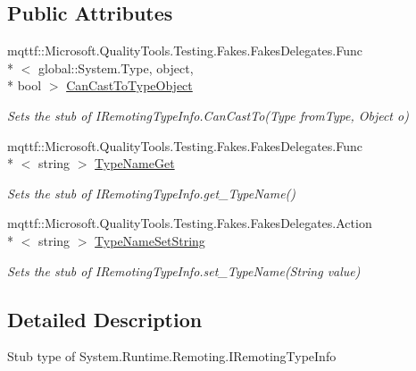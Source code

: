 \subsection*{Public Attributes}
\begin{DoxyCompactItemize}
\item 
mqttf\-::\-Microsoft.\-Quality\-Tools.\-Testing.\-Fakes.\-Fakes\-Delegates.\-Func\\*
$<$ global\-::\-System.\-Type, object, \\*
bool $>$ \hyperlink{class_system_1_1_runtime_1_1_remoting_1_1_fakes_1_1_stub_i_remoting_type_info_abefce566b24758bd25e3bb2ed4827655}{Can\-Cast\-To\-Type\-Object}
\begin{DoxyCompactList}\small\item\em Sets the stub of I\-Remoting\-Type\-Info.\-Can\-Cast\-To(\-Type from\-Type, Object o)\end{DoxyCompactList}\item 
mqttf\-::\-Microsoft.\-Quality\-Tools.\-Testing.\-Fakes.\-Fakes\-Delegates.\-Func\\*
$<$ string $>$ \hyperlink{class_system_1_1_runtime_1_1_remoting_1_1_fakes_1_1_stub_i_remoting_type_info_ac6a30122dd3130e626103a717c73b821}{Type\-Name\-Get}
\begin{DoxyCompactList}\small\item\em Sets the stub of I\-Remoting\-Type\-Info.\-get\-\_\-\-Type\-Name()\end{DoxyCompactList}\item 
mqttf\-::\-Microsoft.\-Quality\-Tools.\-Testing.\-Fakes.\-Fakes\-Delegates.\-Action\\*
$<$ string $>$ \hyperlink{class_system_1_1_runtime_1_1_remoting_1_1_fakes_1_1_stub_i_remoting_type_info_ab6f5d4d90caec5b61adbe59b2f784f01}{Type\-Name\-Set\-String}
\begin{DoxyCompactList}\small\item\em Sets the stub of I\-Remoting\-Type\-Info.\-set\-\_\-\-Type\-Name(\-String value)\end{DoxyCompactList}\end{DoxyCompactItemize}


\subsection{Detailed Description}
Stub type of System.\-Runtime.\-Remoting.\-I\-Remoting\-Type\-Info



